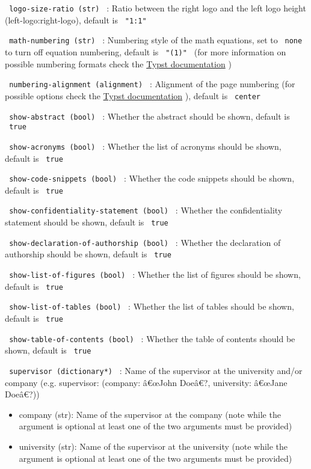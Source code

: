 \texttt{\ logo-size-ratio\ (str)\ } : Ratio between the right logo and
the left logo height (left-logo:right-logo), default is
\texttt{\ "1:1"\ }

\texttt{\ math-numbering\ (str)\ } : Numbering style of the math
equations, set to \texttt{\ none\ } to turn off equation numbering,
default is \texttt{\ "(1)"\ } (for more information on possible
numbering formats check the
\href{https://typst.app/docs/reference/model/numbering}{Typst
documentation} )

\texttt{\ numbering-alignment\ (alignment)\ } : Alignment of the page
numbering (for possible options check the
\href{https://typst.app/docs/reference/layout/alignment/}{Typst
documentation} ), default is \texttt{\ center\ }

\texttt{\ show-abstract\ (bool)\ } : Whether the abstract should be
shown, default is \texttt{\ true\ }

\texttt{\ show-acronyms\ (bool)\ } : Whether the list of acronyms should
be shown, default is \texttt{\ true\ }

\texttt{\ show-code-snippets\ (bool)\ } : Whether the code snippets
should be shown, default is \texttt{\ true\ }

\texttt{\ show-confidentiality-statement\ (bool)\ } : Whether the
confidentiality statement should be shown, default is \texttt{\ true\ }

\texttt{\ show-declaration-of-authorship\ (bool)\ } : Whether the
declaration of authorship should be shown, default is \texttt{\ true\ }

\texttt{\ show-list-of-figures\ (bool)\ } : Whether the list of figures
should be shown, default is \texttt{\ true\ }

\texttt{\ show-list-of-tables\ (bool)\ } : Whether the list of tables
should be shown, default is \texttt{\ true\ }

\texttt{\ show-table-of-contents\ (bool)\ } : Whether the table of
contents should be shown, default is \texttt{\ true\ }

\texttt{\ supervisor\ (dictionary*)\ } : Name of the supervisor at the
university and/or company (e.g. supervisor: (company: â€œJohn Doeâ€?,
university: â€œJane Doeâ€?))

\begin{itemize}
\tightlist
\item
  company (str): Name of the supervisor at the company (note while the
  argument is optional at least one of the two arguments must be
  provided)
\item
  university (str): Name of the supervisor at the university (note while
  the argument is optional at least one of the two arguments must be
  provided)
\end{itemize}

